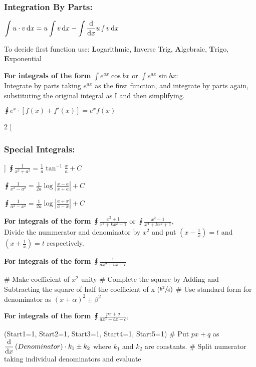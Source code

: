 \documentclass[Math.tex]{subfiles}
\begin{document}
\subsubsection*{Integration By Parts:}
$\displaystyle\int u\cdot v\,\mathrm{d}x = u\displaystyle\int v\,\mathrm{d}x - \displaystyle\int\displaystyle\frac{\mathop{}\!\mathrm{d}}{\mathop{}\!\mathrm{d} x} u\smallint v\,\mathrm{d}x$

To decide first function use: \textbf{L}ogarithmic, \textbf{I}nverse Trig, \textbf{A}lgebraic, \textbf{T}rigo, \textbf{E}xponential

\textbf{For integrals of the form} $\int{e^{ax}\cos bx}$ or $\int{e^{ax}\sin bx}$:\\
Integrate by parts taking $e^{ax}$ as the first function, and integrate by parts again, substituting the original integral as I and then simplifying.


$\intx{e^x\cdot\left[f(x) + f'(x)\right] = e^x f(x)}$

\begin{multicols}{2}
[\subsubsection*{Special Integrals:}]
$\intx{\frac{1}{x^2 + a^2}} = \frac{1}{a} \tan ^{-1}\frac{x}{a} + C$

$\intx{\frac{1}{x^2 - a^2}} = \frac{1}{2a}\log\left|\frac{x - a}{x + a}\right| + C$

$\intx{\frac{1}{a^2 - x^2}} = \frac{1}{2a}\log\left|\frac{a + x}{a - x}\right| + C$ 
\end{multicols}

\textbf{For integrals of the form} $\intx{\frac{x^2 + 1}{x^4 + kx^2 + 1}}$ or $\intx{\frac{x^2 - 1}{x^4 + kx^2 + 1}}$,\\
Divide the nummerator and denominator by $x^2$ and put $\displaystyle \left(x - \frac{1}{x}\right) = t$ and $\displaystyle \left(x + \frac{1}{x}\right) = t$ respectively. 

\textbf{For integrals of the form} $\intx{\frac{1}{ax^2 + bx + c}}$


\begin{easylist}
	# Make coefficient of $x^2$ unity
	# Complete the square by Adding and Subtracting the square of half the coefficient of x $\left(\sfrac{b^2}{4} \right)$
	# Use standard form for denominator as $(x + \alpha)^2 \pm \beta ^2$
\end{easylist}


\textbf{For integrals of the form} $\intx{\frac{px + q}{ax^2 + bx + c}}$,\\
\begin{easylist}
	\ListProperties(Start1=1, Start2=1, Start3=1, Start4=1, Start5=1)
	# Put $px + q$ as $\displaystyle\frac{\mathop{}\!\mathrm{d}}{\mathop{}\!\mathrm{d} x} \left(Denominator\right)\cdot k_1 \pm k_2$ where $k_1$ and $k_2$ are constants.
	# Split numerator taking individual denominators and evaluate
\end{easylist}
\end{document}

